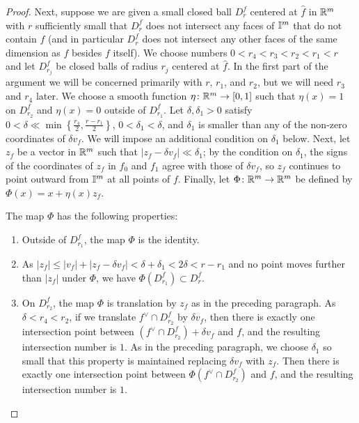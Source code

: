 \begin{proof}
	Next, suppose we are given a small closed ball $D^f_r$ centered at $\hat f$ in $\mathbb{R}^m$ with $r$ sufficiently small that $D^f_r$ does not intersect any faces of $\mathbb{I}^m$ that do not contain $f$ (and in particular $D^f_r$ does not intersect any other faces of the same dimension as $f$ besides $f$ itself).
	We choose numbers $0<r_4 < r_3 < r_2<r_1<r$ and let $D^f_{r_j}$ be closed balls of radius $r_j$ centered at $\hat f$.
	In the first part of the argument we will be concerned primarily with $r$, $r_1$, and $r_2$, but we will need $r_3$ and $r_4$ later.
	We choose a smooth function $\eta \colon \mathbb{R}^m \to [0,1]$ such that $\eta(x) = 1$ on $D^f_{r_2}$ and $\eta(x) = 0$ outside of $D^f_{r_1}$.
	Let $\delta, \delta_1 > 0$ satisfy $0 < \delta \ll \min\left\{\frac{r_4}{2}, \frac{r-r_1}{2}\right\}$, $0 < \delta_1 < \delta$, and $\delta_1$ is smaller than any of the non-zero coordinates of $\delta v_f$.
	We will impose an additional condition on $\delta_1$ below.
	Next, let $z_f$ be a vector in $\mathbb{R}^m$ such that $|z_f-\delta v_f|\ll \delta_1$; by the condition on $\delta_1$, the signs of the coordinates of $z_f$ in $f_0$ and $f_1$ agree with those of $\delta v_f$, so $z_f$ continues to point outward from $\mathbb{I}^m$ at all points of $f$.
	Finally, let $\Phi \colon \mathbb{R}^m \to \mathbb{R}^m$ be defined by $\Phi(x) = x+ \eta(x) z_f$.

	The map $\Phi$ has the following properties:
	\begin{enumerate}
		\item Outside of $D^f_{r_1}$, the map $\Phi$ is the identity.

		\item As $|z_f|\leq |v_f| + |z_f-\delta v_f| < \delta+\delta_1 < 2 \delta < r-r_1$ and no point moves further than $|z_f|$ under $\Phi$, we have $\Phi(D^f_{r_1})\subset D^f_r$.

		\item On $D_{r_2}^f$, the map $\Phi$ is translation by $z_f$ as in the preceding paragraph.
			As $\delta < r_4 < r_2$, if we translate $f^\vee \cap D_{r_2}^f$ by $\delta v_f$, then there is exactly one intersection point between $(f^\vee \cap D_{r_2}^f) + \delta v_f$ and $f$, and the resulting intersection number is $1$.
			As in the preceding paragraph, we choose $\delta_1$ so small that this property is maintained replacing $\delta v_f$ with $z_f$.
			Then there is exactly one intersection point between $\Phi(f^\vee \cap D_{r_2}^f)$ and $f$, and the resulting intersection number is $1$.

			\begin{comment}	\item As $|z_f| < 2\delta < r_4$, the interior of $D_{r_4}^f$ (and hence all $D_{r_j}^f$) contains both $\hat f$ and $\hat f-z_f$, the latter of which is in the interior of $\interval^m$ as $z_f$ points outward from $\interval^m$, in the $f_0$ and $f_1$ directions.
			\end{comment}


\end{enumerate}
\end{proof}
